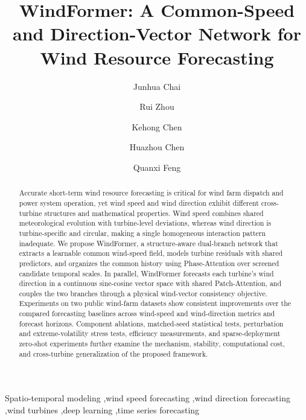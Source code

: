 \documentclass[preprint,review,12pt]{elsarticle}
\begin{document}
\begin{frontmatter}

\title{WindFormer: A Common-Speed and Direction-Vector Network for Wind Resource Forecasting}

\author[inst1]{Junhua Chai}
\author[inst1]{Rui Zhou}
\author[inst1]{Kehong Chen}
\author[inst1]{Huazhou Chen}
\author[inst1]{Quanxi Feng}
\address[inst1]{School of Mathematics and Statistics, Guilin University of Technology, Guilin, China.}

\begin{abstract}
Accurate short-term wind resource forecasting is critical for wind farm dispatch and power system operation, yet wind speed and wind direction exhibit different cross-turbine structures and mathematical properties. Wind speed combines shared meteorological evolution with turbine-level deviations, whereas wind direction is turbine-specific and circular, making a single homogeneous interaction pattern inadequate. We propose WindFormer, a structure-aware dual-branch network that extracts a learnable common wind-speed field, models turbine residuals with shared predictors, and organizes the common history using Phase-Attention over screened candidate temporal scales. In parallel, WindFormer forecasts each turbine's wind direction in a continuous sine-cosine vector space with shared Patch-Attention, and couples the two branches through a physical wind-vector consistency objective. Experiments on two public wind-farm datasets show consistent improvements over the compared forecasting baselines across wind-speed and wind-direction metrics and forecast horizons. Component ablations, matched-seed statistical tests, perturbation and extreme-volatility stress tests, efficiency measurements, and sparse-deployment zero-shot experiments further examine the mechanism, stability, computational cost, and cross-turbine generalization of the proposed framework.
\end{abstract}

\begin{keyword}
Spatio-temporal modeling \sep wind speed forecasting \sep wind direction forecasting \sep wind turbines \sep deep learning \sep time series forecasting
\end{keyword}
\end{frontmatter}
\end{document}

